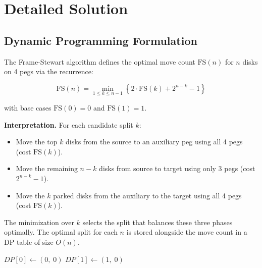 \documentclass[12pt, a4paper]{article}
\begin{document}
\section{Detailed Solution}
\label{sec:solution}

\subsection{Dynamic Programming Formulation}

The Frame-Stewart algorithm defines the optimal move count $\text{FS}(n)$ for $n$ disks on 4 pegs via the recurrence:

\begin{equation}
\label{eq:recurrence}
\text{FS}(n) = \min_{1 \leq k \leq n-1} \left\{ 2 \cdot \text{FS}(k) + 2^{n-k} - 1 \right\}
\end{equation}

with base cases $\text{FS}(0) = 0$ and $\text{FS}(1) = 1$.

\textbf{Interpretation.} For each candidate split $k$:
\begin{itemize}[leftmargin=2em]
    \item Move the top $k$ disks from the source to an auxiliary peg using all 4 pegs (cost $\text{FS}(k)$).
    \item Move the remaining $n - k$ disks from source to target using only 3 pegs (cost $2^{n-k} - 1$).
    \item Move the $k$ parked disks from the auxiliary to the target using all 4 pegs (cost $\text{FS}(k)$).
\end{itemize}

The minimization over $k$ selects the split that balances these three phases optimally.
The optimal split for each $n$ is stored alongside the move count in a DP table of size $O(n)$.

\begin{algorithm}[H]
$\textit{DP}[0] \leftarrow (0,\; 0)$\;
$\textit{DP}[1] \leftarrow (1,\; 0)$\;
\caption{\textsc{PrecomputeDP}$(N)$}
\label{alg:dp}
\end{algorithm}
\end{document}
